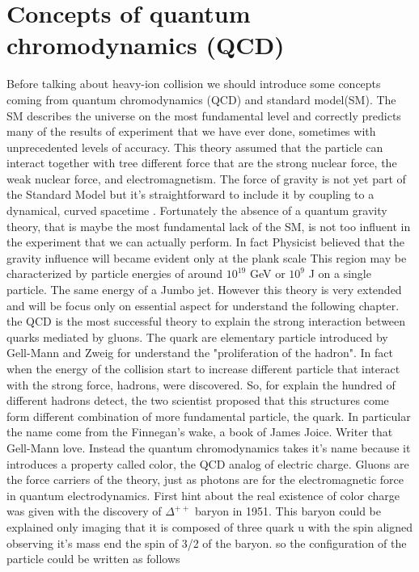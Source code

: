 \documentclass[12pt,a4paper]{book}
\begin{document}
	
	\chapter{Concepts of quantum chromodynamics (QCD)}
	Before talking about heavy-ion collision we should introduce some concepts coming from quantum chromodynamics (QCD) and standard model(SM). The SM describes the universe on the most fundamental level and correctly predicts many of the results of experiment that we have ever done, sometimes with unprecedented levels of accuracy. This theory assumed that the particle can interact together with tree different force that are the strong nuclear force, the weak nuclear force, and electromagnetism. The force of gravity is not yet part of the Standard Model but it’s straightforward to include it by coupling to a dynamical, curved spacetime \cite{quevedo2024cambridgelecturesstandardmodel}. Fortunately the absence of a quantum gravity theory, that is maybe the most fundamental lack of the SM, is not too influent in the experiment that we can actually perform. In fact Physicist believed that the gravity influence will became evident only at the plank scale This region may be characterized by particle energies of around $10^{19}$ GeV or $10^9$ J on a single particle. The same energy of a Jumbo jet. However this theory is very extended and will be focus only on essential aspect for understand the following chapter.  
	the QCD is the most successful theory to explain the strong interaction between quarks mediated by gluons. The quark are elementary particle introduced by Gell-Mann and Zweig for understand the "proliferation of the hadron". In fact when the energy of the collision start to increase different particle that interact with the strong force, hadrons,  were discovered. So, for explain the hundred of different hadrons detect, the two scientist proposed that this structures come form different combination of more fundamental particle, the quark. In particular the name come from the Finnegan's wake, a book of James Joice. Writer that Gell-Mann love. Instead the quantum chromodynamics takes it's name because it introduces a property called color, the QCD analog of electric charge. Gluons are the force carriers of the theory, just as photons are for the electromagnetic force in quantum electrodynamics. 
	First hint about the real existence of color charge was given with the discovery of $\Delta^{++}$ baryon in 1951.  This baryon could be explained only imaging that it is composed of three quark u with the spin aligned observing it's mass end the spin of 3/2 of the baryon. so the configuration of the particle could be written as follows 
\end{document}
